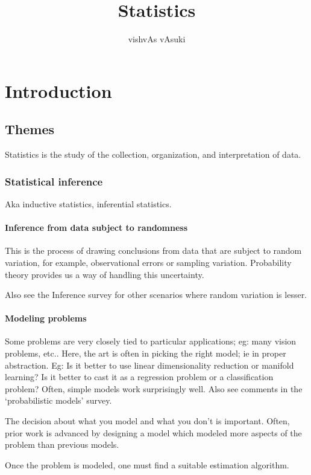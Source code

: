 \documentclass[oneside, article]{memoir}
\title{Statistics}
\author{vishvAs vAsuki}
\begin{document}
\maketitle

\tableofcontents

\part{Introduction}
\chapter{Themes}
Statistics is the study of the collection, organization, and interpretation of data.

\section{Statistical inference}
Aka inductive statistics, inferential statistics.

\subsection{Inference from data subject to randomness}
This is the process of drawing conclusions from data that are subject to random variation, for example, observational errors or sampling variation. Probability theory provides us a way of handling this uncertainty.

Also see the Inference survey for other scenarios where random variation is lesser.

\subsection{Modeling problems}
Some problems are very closely tied to particular applications; eg: many vision problems, etc.. Here, the art is often in picking the right model; ie in proper abstraction. Eg: Is it better to use linear dimensionality reduction or manifold learning? Is it better to cast it as a regression problem or a classification problem? Often, simple models work surprisingly well. Also see comments in the `probabilistic models' survey.

The decision about what you model and what you don't is important. Often, prior work is advanced by designing a model which modeled more aspects of the problem than previous models.

Once the problem is modeled, one must find a suitable estimation algorithm.
\end{document}
